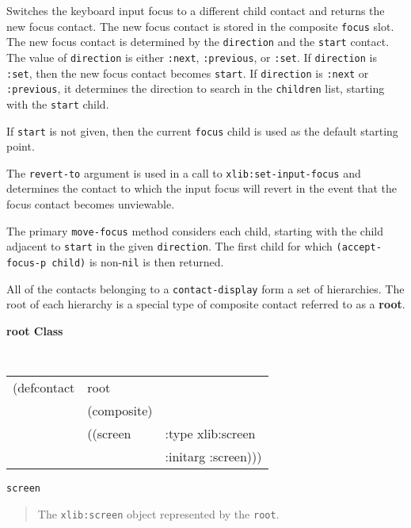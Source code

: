 \documentclass[twoside]{book}
\begin{document}
\begin{sloppy}
{\begin{flushright}
{}\end{flushright}}

\begin{flushright} \parbox[t]{6.125in}{
Switches the keyboard input focus to a different child contact and returns the new focus
contact. The new focus contact is stored in the composite {\tt focus} slot.
The new focus contact is determined by the {\tt direction} and the {\tt start}
contact. The value of {\tt direction} is either {\tt :next}, {\tt :previous}, or
{\tt :set}. If {\tt direction} is {\tt :set}, then the new focus contact becomes
{\tt start}. If {\tt direction} is {\tt :next} or {\tt :previous}, it determines
the direction to search in the {\tt children} list, starting with
the {\tt start} child. 

If {\tt start} is not given, then the current {\tt focus}
child is used as the default starting point.

The {\tt revert-to} argument is used in a call to {\tt xlib:set-input-focus} and
determines the contact to which the input focus will revert in the event that
the focus contact becomes unviewable.

The primary {\tt move-focus} method considers each child, starting with
the child adjacent to {\tt start}
in the given {\tt direction}. The first child for which {\tt (accept-focus-p
child)} is non-{\tt nil} is then returned.

}\end{flushright}





All of the contacts belonging to a {\tt contact-display} form a set of
hierarchies. The root of each hierarchy is a special type of composite contact
referred to as a {\bf root}.


{\samepage
{\large {\bf root \hfill Class}} 
\begin{flushright} \parbox[t]{6.125in}{
\tt
\begin{tabular}{lll}
\raggedright
(defcontact & root  & \\ 
& (composite) & \\
&((screen & :type xlib:screen\\ 
&          & :initarg :screen)))
\end{tabular}
\rm

}\end{flushright}}

\begin{flushright} \parbox[t]{6.125in}{
{\tt screen}
\begin{quote}
The {\tt xlib:screen} object represented by the {\tt root}.
\end{quote}

}
\end{flushright}
\end{sloppy}
\end{document}
